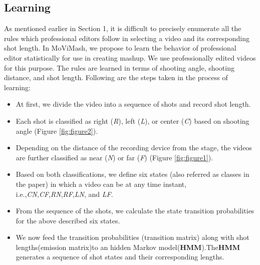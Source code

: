 \documentclass{sig-alternate}
\begin{document}
\subsection{Learning}
As mentioned earlier in Section 1, it is difficult to precisely enumerate all the rules which professional editors follow in selecting a video and its corresponding shot length. In MoViMash, we propose to learn the behavior of professional editor statistically for use in creating mashup. We use professionally edited videos for this purpose. The rules are learned in terms of shooting angle, shooting distance, and shot length. Following are the steps taken in the process of learning:
\begin{itemize}
\item At first, we divide the video into a sequence of shots and record shot length. 
\item Each shot is classified as right (\textsf{\textit{R}}), left (\textsf{\textit{L}}), or center (\textsf{\textit{C}}) based on shooting angle (Figure \ref{fig:figure2}). 
\item Depending on the distance of the recording device from the stage, the videos are further classiﬁed as near (\textsf{\textit{N}}) or far (\textsf{\textit{F}}) (Figure \ref{fig:figure1}). 
\item Based on both classifications, we define six states (also referred as classes in the paper) in which a video can be at any time instant, i.e.,\textsf{\textit{CN}},\textsf{\textit{CF}},\textsf{\textit{RN}},\textsf{\textit{RF}},\textsf{\textit{LN}}, and \textsf{\textit{LF}}. 
\item From the sequence of the shots, we calculate the state transition probabilities for the above described six states. 
\item We now feed the transition probabilities (transition matrix) along with shot lengths(emission matrix)to an hidden Markov model(\textbf{HMM}).The\textbf{HMM} generates a sequence of shot states and their corresponding lengths.

\end{itemize}
\end{document}

